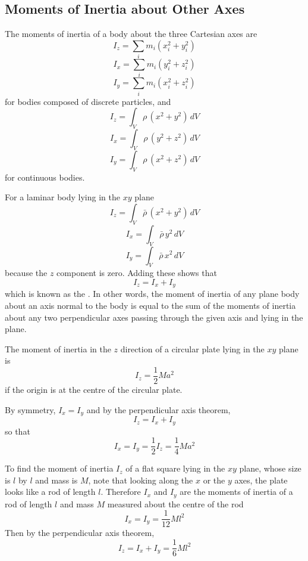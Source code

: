 \subsection{Moments of Inertia about Other Axes}

The moments of inertia of a body about the three Cartesian axes are
$$I_z=\sum_im_i(x_i^2+y_i^2)$$
$$I_x=\sum_im_i(y_i^2+z_i^2)$$
$$I_y=\sum_im_i(x_i^2+z_i^2)$$
for bodies composed of discrete particles, and
$$I_z=\int_V\rho\,(x^2+y^2)\,dV$$
$$I_x=\int_V\rho\,(y^2+z^2)\,dV$$
$$I_y=\int_V\rho\,(x^2+z^2)\,dV$$
for continuous bodies.

For a laminar body lying in the $xy$ plane
$$I_z=\int_V\bar{\rho}\,(x^2+y^2)\,dV$$
$$I_x=\int_V\bar{\rho}\,y^2\,dV$$
$$I_y=\int_V\bar{\rho}\,x^2\,dV$$
because the $z$ component is zero.  Adding these shows that
$$I_z=I_x+I_y$$
which is known as the . In other words,
the moment of inertia of any plane body about an axis normal to the body is
equal to the sum of the moments of inertia about any two perpendicular axes
passing through the given axis and lying in the plane.

\begin{example}
The moment of inertia in the $z$ direction of a circular plate lying in the
$xy$ plane is
$$I_z=\frac{1}{2}Ma^2$$
if the origin is at the centre of the circular plate.  

By symmetry, $I_x=I_y$ and by the perpendicular axis theorem,
$$I_z=I_x+I_y$$ 
so that
$$I_x=I_y=\frac{1}{2}I_z=\frac{1}{4}Ma^2$$
\end{example}

\begin{example}
To find the moment of inertia $I_z$ of a flat square lying in the $xy$
plane, whose size is $l$ by $l$ and mass is $M$, note that looking along the
$x$ or the $y$ axes, the plate looks like a rod of length $l$.  Therefore
$I_x$ and $I_y$ are the moments of inertia of a rod of length $l$ and mass
$M$ measured about the centre of the rod
$$I_x=I_y=\frac{1}{12}Ml^2$$
Then by the perpendicular axis theorem,
$$I_z=I_x+I_y=\frac{1}{6}Ml^2$$
\end{example}


